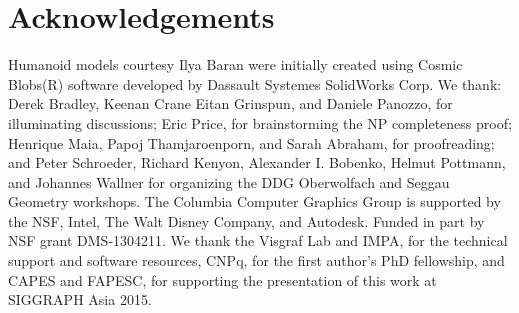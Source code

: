 \section*{Acknowledgements}
%
Humanoid models courtesy Ilya Baran were initially created using Cosmic
Blobs(R) software developed by Dassault Systemes SolidWorks Corp.
%
We thank: Derek Bradley, Keenan Crane Eitan Grinspun, and Daniele Panozzo, for
illuminating discussions;
%
Eric Price, for brainstorming the NP completeness proof;
%
Henrique Maia, Papoj Thamjaroenporn, and Sarah Abraham, for proofreading; and
Peter Schroeder, Richard Kenyon, Alexander I. Bobenko, Helmut Pottmann, and
Johannes Wallner for organizing the DDG Oberwolfach and Seggau Geometry
workshops.
%
The Columbia Computer Graphics Group is supported by the NSF, Intel, The Walt
Disney Company, and Autodesk.
%
Funded in part by NSF grant DMS-1304211.
%
We thank the Visgraf Lab and IMPA, for the technical support and software resources, CNPq, for the first author's PhD fellowship, and CAPES and FAPESC, for supporting the presentation of this work at SIGGRAPH Asia 2015.
